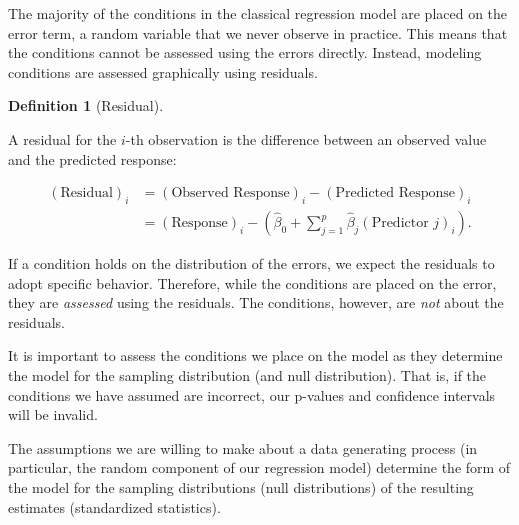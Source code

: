 \documentclass[
  letterpaper,
  DIV=11,
  numbers=noendperiod]{scrreprt}
\theoremstyle{definition}
\newtheorem{definition}{Definition}[chapter]
\theoremstyle{definition}
\theoremstyle{remark}
\begin{document}
The majority of the conditions in the classical regression model are
placed on the error term, a random variable that we never observe in
practice. This means that the conditions cannot be assessed using the
errors directly. Instead, modeling conditions are assessed graphically
using residuals.

\begin{definition}[Residual]\protect\hypertarget{def-residual}{}\label{def-residual}

A residual for the \(i\)-th observation is the difference between an
observed value and the predicted response:

\[
\begin{aligned}
  (\text{Residual})_i 
    &= (\text{Observed Response})_i - (\text{Predicted Response})_i \\
    &= (\text{Response})_i - \left(\widehat{\beta}_0 + \sum_{j=1}^{p} \widehat{\beta}_j (\text{Predictor } j)_i\right).
\end{aligned}
\]

\end{definition}

\begin{tcolorbox}[enhanced jigsaw, left=2mm, toprule=.15mm, arc=.35mm, breakable, opacitybacktitle=0.6, opacityback=0, rightrule=.15mm, colbacktitle=quarto-callout-tip-color!10!white, coltitle=black, leftrule=.75mm, toptitle=1mm, colframe=quarto-callout-tip-color-frame, titlerule=0mm, title=\textcolor{quarto-callout-tip-color}{\faLightbulb}\hspace{0.5em}{Big Idea}, bottomrule=.15mm, colback=white, bottomtitle=1mm]

If a condition holds on the distribution of the errors, we expect the
residuals to adopt specific behavior. Therefore, while the conditions
are placed on the error, they are \emph{assessed} using the residuals.
The conditions, however, are \emph{not} about the residuals.

\end{tcolorbox}

It is important to assess the conditions we place on the model as they
determine the model for the sampling distribution (and null
distribution). That is, if the conditions we have assumed are incorrect,
our p-values and confidence intervals will be invalid.

\begin{tcolorbox}[enhanced jigsaw, left=2mm, toprule=.15mm, arc=.35mm, breakable, opacitybacktitle=0.6, opacityback=0, rightrule=.15mm, colbacktitle=quarto-callout-tip-color!10!white, coltitle=black, leftrule=.75mm, toptitle=1mm, colframe=quarto-callout-tip-color-frame, titlerule=0mm, title=\textcolor{quarto-callout-tip-color}{\faLightbulb}\hspace{0.5em}{Big Idea}, bottomrule=.15mm, colback=white, bottomtitle=1mm]

The assumptions we are willing to make about a data generating process
(in particular, the random component of our regression model) determine
the form of the model for the sampling distributions (null
distributions) of the resulting estimates (standardized statistics).

\end{tcolorbox}
\end{document}
